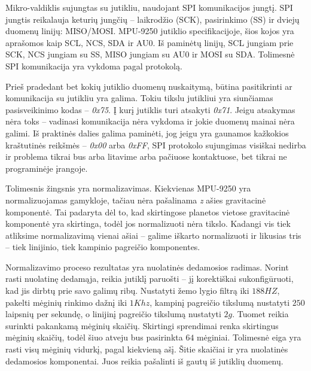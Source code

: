 Mikro-valdiklis sujungtas su jutikliu, naudojant SPI komunikacijos jungtį.
SPI jungtis reikalauja keturių jungčių -- laikrodžio (SCK), pasirinkimo (SS) ir dviejų duomenų linijų: MISO/MOSI.
MPU-9250 jutiklio specifikacijoje, šios kojos yra aprašomos kaip SCL, NCS, SDA ir AU0.
Iš paminėtų linijų, SCL jungiam prie SCK, NCS jungiam su SS, MISO jungiam su AU0 ir MOSI su SDA.
Tolimesnė SPI komunikacija yra vykdoma pagal protokolą.

Prieš pradedant bet kokių jutiklio duomenų nuskaitymą, būtina pasitikrinti ar komunikacija su jutikliu yra galima.
Tokiu tikslu jutikliui yra siunčiamas pasisveikinimo kodas -- \textit{0x75}.
Į kurį jutiklis turi atsakyti \textit{0x71}.
Jeigu atsakymas nėra toks -- vadinasi komunikacija nėra vykdoma ir jokie duomenų mainai nėra galimi.
Iš praktinės dalies galima paminėti, jog jeigu yra gaunamos kažkokios kraštutinės reikšmės -- \textit{0x00} arba \textit{0xFF}, SPI protokolo sujungimas visiškai nedirba ir problema tikrai bus arba litavime arba pačiuose kontaktuose, bet tikrai ne programinėje įrangoje.

Tolimesnis žingsnis yra normalizavimas.
Kiekvienas MPU-9250 yra normalizuojamas gamykloje, tačiau nėra pašalinama \textit{z} ašies gravitacinė komponentė.
Tai padaryta dėl to, kad skirtingose planetos vietose gravitacinė komponentė yra skirtinga, todėl jos normalizuoti nėra tikslo.
Kadangi vis tiek atliksime normalizavimą vienai ašiai -- galime iškarto normalizuoti ir likusias tris -- tiek linijinio, tiek kampinio pagreičio komponentes.

Normalizavimo proceso rezultatas yra nuolatinės dedamosios radimas.
Norint rasti nuolatinę dedamąja, reikia jutiklį paruošti -- jį korektiškai sukonfigūruoti, kad jis dirbtų prie savo galimų ribų.
Nustatyti žemo lygio filtrą iki $188 HZ$, pakelti mėginių rinkimo dažnį iki $1Khz$, kampinį pagreičio tikslumą nustatyti $250$ laipsnių per sekundę, o linijinį pagreičio tikslumą nustatyti $2g$.
Tuomet reikia surinkti pakankamą mėginių skaičių.
Skirtingi sprendimai renka skirtingus mėginių skaičių, todėl šiuo atveju bus pasirinkta $64$ mėginiai.
Tolimesnė eiga yra rasti visų mėginių vidurkį, pagal kiekvieną ašį.
Šitie skaičiai ir yra nuolatinės dedamosios komponentai. Juos reikia pašalinti iš gautų iš jutiklių duomenų.

